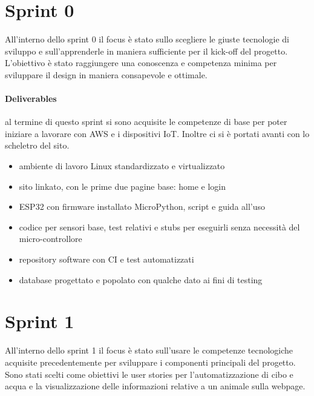         

\section{Sprint 0}
All'interno dello sprint 0 il focus è stato sullo scegliere le giuste tecnologie di sviluppo e sull'apprenderle in maniera sufficiente per il kick-off del progetto.
L'obiettivo è stato raggiungere una conoscenza e competenza minima per sviluppare il design in maniera consapevole e ottimale.
\paragraph{Deliverables} 
al termine di questo sprint si sono acquisite le competenze di base per poter iniziare a lavorare con AWS e i dispositivi IoT. Inoltre ci si è portati avanti con lo scheletro del sito.
\begin{itemize}
    \item ambiente di lavoro Linux standardizzato e virtualizzato
    \item sito linkato, con le prime due pagine base: home e login
    \item ESP32 con firmware installato MicroPython, script e guida all'uso
    \item codice per sensori base, test relativi e stubs per eseguirli senza necessità del micro-controllore
    \item repository software con CI e test automatizzati 
    \item database progettato e popolato con qualche dato ai fini di testing
\end{itemize}

\section{Sprint 1}
All'interno dello sprint 1 il focus è stato sull'usare le competenze tecnologiche acquisite precedentemente per sviluppare i componenti principali del progetto. Sono stati scelti come obiettivi le user stories per l'automatizzazione di cibo e acqua e la visualizzazione delle informazioni relative a un animale sulla webpage.
